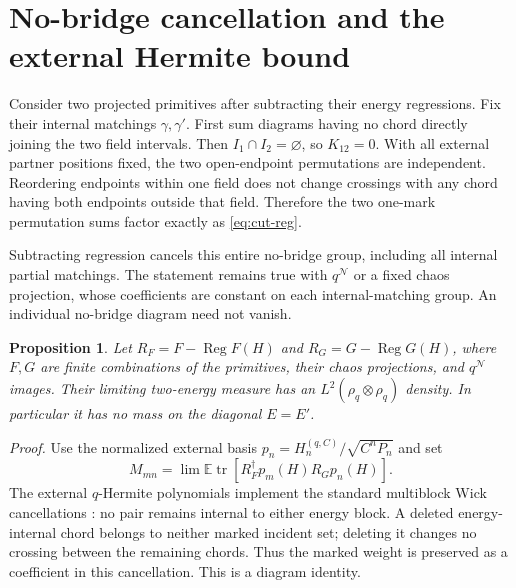 \documentclass[11pt]{article}
\newcommand{\EE}{\mathbb E}
\newcommand{\tr}{\operatorname{tr}}
\newcommand{\NN}{\mathcal N}
\newcommand{\HH}{H^{(q,C)}}
\newcommand{\Reg}{\operatorname{Reg}}
\newtheorem{proposition}{Proposition}
\begin{document}
\newpage
\section{No-bridge cancellation and the external Hermite bound}
Consider two projected primitives after subtracting their energy
regressions. Fix their internal matchings $\gamma,\gamma'$.
First sum diagrams having no chord directly joining the two field
intervals. Then $I_1\cap I_2=\varnothing$, so $K_{12}=0$.
With all external partner positions fixed, the two open-endpoint
permutations are independent. Reordering endpoints within one
field does not change crossings with any chord having both endpoints
outside that field. Therefore the two one-mark permutation sums
factor exactly as \eqref{eq:cut-reg}.

Subtracting regression cancels this entire no-bridge group,
including all internal partial matchings. The statement remains
true with $q^{\NN}$ or a fixed chaos projection, whose coefficients
are constant on each internal-matching group. An individual
no-bridge diagram need not vanish.

\begin{proposition}\label{prop:HS}
Let $R_F=F-\Reg F(H)$ and $R_G=G-\Reg G(H)$, where $F,G$ are
finite combinations of the primitives, their chaos projections,
and $q^{\NN}$ images. Their limiting two-energy measure has an
$L^2(\rho_q\otimes\rho_q)$ density. In particular it has no mass
on the diagonal $E=E'$.
\end{proposition}
\noindent\emph{Proof.}
Use the normalized external basis
$p_n=\HH_n/\sqrt{C^nP_n}$ and set
\begin{equation}
 M_{mn}=\lim\EE\tr[R_F^\dagger p_m(H)R_Gp_n(H)].
\end{equation}
The external $q$-Hermite polynomials implement the standard
multiblock Wick cancellations \cite{EP}: no pair remains internal
to either energy block. A deleted energy-internal chord belongs to
neither marked incident set; deleting it changes no crossing between
the remaining chords. Thus the marked weight is preserved as a
coefficient in this cancellation. This is a diagram identity.
\end{document}
